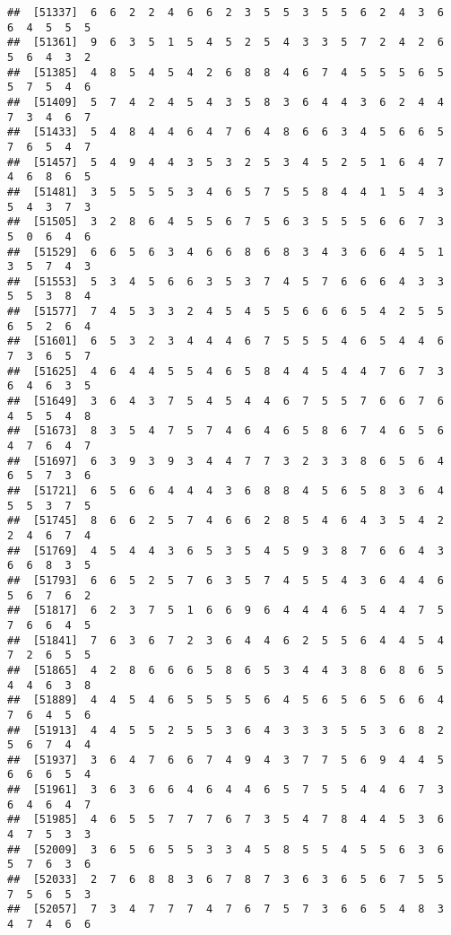 \documentclass[
]{book}
\begin{document}
\begin{verbatim}
##  [51337]  6  6  2  2  4  6  6  2  3  5  5  3  5  5  6  2  4  3  6  6  4  5  5  5
##  [51361]  9  6  3  5  1  5  4  5  2  5  4  3  3  5  7  2  4  2  6  5  6  4  3  2
##  [51385]  4  8  5  4  5  4  2  6  8  8  4  6  7  4  5  5  5  6  5  5  7  5  4  6
##  [51409]  5  7  4  2  4  5  4  3  5  8  3  6  4  4  3  6  2  4  4  7  3  4  6  7
##  [51433]  5  4  8  4  4  6  4  7  6  4  8  6  6  3  4  5  6  6  5  7  6  5  4  7
##  [51457]  5  4  9  4  4  3  5  3  2  5  3  4  5  2  5  1  6  4  7  4  6  8  6  5
##  [51481]  3  5  5  5  5  3  4  6  5  7  5  5  8  4  4  1  5  4  3  5  4  3  7  3
##  [51505]  3  2  8  6  4  5  5  6  7  5  6  3  5  5  5  6  6  7  3  5  0  6  4  6
##  [51529]  6  6  5  6  3  4  6  6  8  6  8  3  4  3  6  6  4  5  1  3  5  7  4  3
##  [51553]  5  3  4  5  6  6  3  5  3  7  4  5  7  6  6  6  4  3  3  5  5  3  8  4
##  [51577]  7  4  5  3  3  2  4  5  4  5  5  6  6  6  5  4  2  5  5  6  5  2  6  4
##  [51601]  6  5  3  2  3  4  4  4  6  7  5  5  5  4  6  5  4  4  6  7  3  6  5  7
##  [51625]  4  6  4  4  5  5  4  6  5  8  4  4  5  4  4  7  6  7  3  6  4  6  3  5
##  [51649]  3  6  4  3  7  5  4  5  4  4  6  7  5  5  7  6  6  7  6  4  5  5  4  8
##  [51673]  8  3  5  4  7  5  7  4  6  4  6  5  8  6  7  4  6  5  6  4  7  6  4  7
##  [51697]  6  3  9  3  9  3  4  4  7  7  3  2  3  3  8  6  5  6  4  6  5  7  3  6
##  [51721]  6  5  6  6  4  4  4  3  6  8  8  4  5  6  5  8  3  6  4  5  5  3  7  5
##  [51745]  8  6  6  2  5  7  4  6  6  2  8  5  4  6  4  3  5  4  2  2  4  6  7  4
##  [51769]  4  5  4  4  3  6  5  3  5  4  5  9  3  8  7  6  6  4  3  6  6  8  3  5
##  [51793]  6  6  5  2  5  7  6  3  5  7  4  5  5  4  3  6  4  4  6  5  6  7  6  2
##  [51817]  6  2  3  7  5  1  6  6  9  6  4  4  4  6  5  4  4  7  5  7  6  6  4  5
##  [51841]  7  6  3  6  7  2  3  6  4  4  6  2  5  5  6  4  4  5  4  7  2  6  5  5
##  [51865]  4  2  8  6  6  6  5  8  6  5  3  4  4  3  8  6  8  6  5  4  4  6  3  8
##  [51889]  4  4  5  4  6  5  5  5  5  6  4  5  6  5  6  5  6  6  4  7  6  4  5  6
##  [51913]  4  4  5  5  2  5  5  3  6  4  3  3  3  5  5  3  6  8  2  5  6  7  4  4
##  [51937]  3  6  4  7  6  6  7  4  9  4  3  7  7  5  6  9  4  4  5  6  6  6  5  4
##  [51961]  3  6  3  6  6  4  6  4  4  6  5  7  5  5  4  4  6  7  3  6  4  6  4  7
##  [51985]  4  6  5  5  7  7  7  6  7  3  5  4  7  8  4  4  5  3  6  4  7  5  3  3
##  [52009]  3  6  5  6  5  5  3  3  4  5  8  5  5  4  5  5  6  3  6  5  7  6  3  6
##  [52033]  2  7  6  8  8  3  6  7  8  7  3  6  3  6  5  6  7  5  5  7  5  6  5  3
##  [52057]  7  3  4  7  7  7  4  7  6  7  5  7  3  6  6  5  4  8  3  4  7  4  6  6

\end{verbatim}
\end{document}

